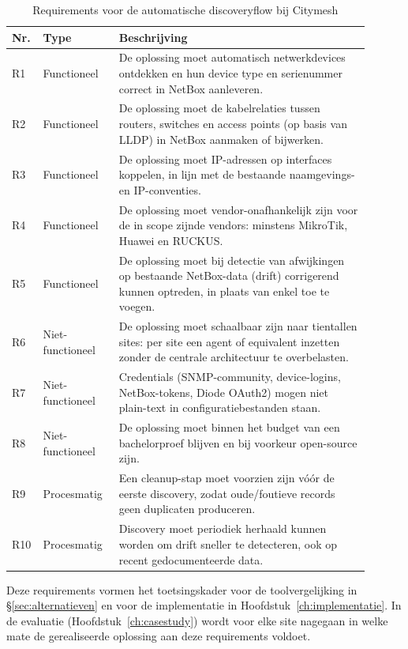 \begin{table}[H]
  \centering
  \caption[Requirements voor de automatische discoveryflow]{Requirements voor de automatische discoveryflow bij Citymesh}
  \label{tab:requirements}
  \footnotesize
  \begin{tabular}{p{0.04\linewidth} p{0.20\linewidth} p{0.66\linewidth}}
    \toprule
    \textbf{Nr.} & \textbf{Type} & \textbf{Beschrijving} \\
    \midrule
    R1 & Functioneel & De oplossing moet automatisch netwerkdevices ontdekken en hun device type en serienummer correct in NetBox aanleveren. \\
    R2 & Functioneel & De oplossing moet de kabelrelaties tussen routers, switches en access points (op basis van LLDP) in NetBox aanmaken of bijwerken. \\
    R3 & Functioneel & De oplossing moet IP-adressen op interfaces koppelen, in lijn met de bestaande naamgevings- en IP-conventies. \\
    R4 & Functioneel & De oplossing moet vendor-onafhankelijk zijn voor de in scope zijnde vendors: minstens MikroTik, Huawei en RUCKUS. \\
    R5 & Functioneel & De oplossing moet bij detectie van afwijkingen op bestaande NetBox-data (drift) corrigerend kunnen optreden, in plaats van enkel toe te voegen. \\
    R6 & Niet-functioneel & De oplossing moet schaalbaar zijn naar tientallen sites: per site een agent of equivalent inzetten zonder de centrale architectuur te overbelasten. \\
    R7 & Niet-functioneel & Credentials (SNMP-community, device-logins, NetBox-tokens, Diode OAuth2) mogen niet plain-text in configuratiebestanden staan. \\
    R8 & Niet-functioneel & De oplossing moet binnen het budget van een bachelorproef blijven en bij voorkeur open-source zijn. \\
    R9 & Procesmatig & Een cleanup-stap moet voorzien zijn vóór de eerste discovery, zodat oude/foutieve records geen duplicaten produceren. \\
    R10 & Procesmatig & Discovery moet periodiek herhaald kunnen worden om drift sneller te detecteren, ook op recent gedocumenteerde data. \\
    \bottomrule
  \end{tabular}
\end{table}

Deze requirements vormen het toetsingskader voor de tool\-vergelijking in \S\ref{sec:alternatieven} en voor de implementatie in Hoofdstuk~\ref{ch:implementatie}. In de evaluatie (Hoofdstuk~\ref{ch:casestudy}) wordt voor elke site nagegaan in welke mate de gerealiseerde oplossing aan deze requirements voldoet.
